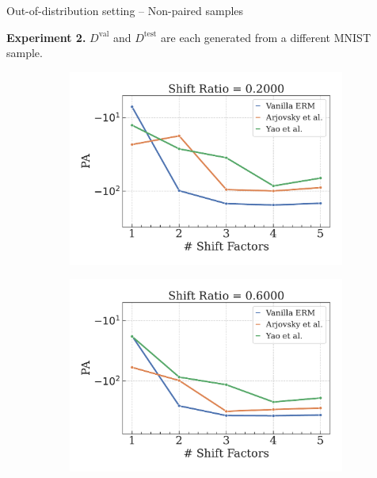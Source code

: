 \begin{frame}{Out-of-distribution setting -- Non-paired samples}

	\vspace{0.2cm}

	\textbf{Experiment 2.} $D^{\text{val}}$ and $D^{\text{test}}$ are each generated from a different MNIST sample.
	
	\begin{figure}[H]
		\centering
		\begin{subfigure}[b]{0.3\textwidth}
			\centering
			\includegraphics[width=\textwidth]{img/distribution/shift_ratio=0.200.pdf}
		\end{subfigure}
		\hfill
		\begin{subfigure}[b]{0.3\textwidth}
			\centering
			\includegraphics[width=\textwidth]{img/distribution/shift_ratio=0.600.pdf}

\end{subfigure}
\end{figure}
\end{frame}
